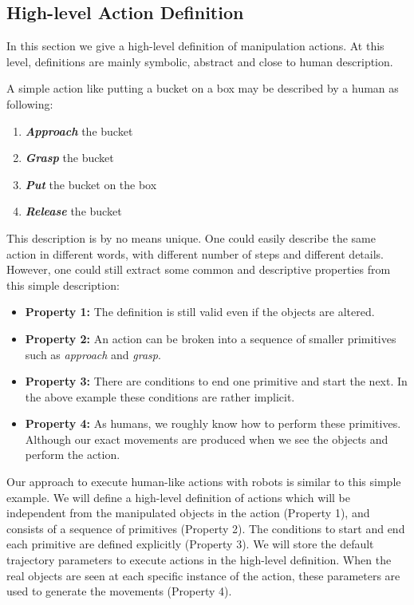  
  


\subsection{High-level Action Definition}
\label{sec:high-level}

In this section we give a high-level definition of manipulation actions.
At this level, definitions are mainly symbolic, abstract and close to human description.

A simple action like putting a bucket on a box may be described by a human as following:
\begin{enumerate}
  \item \textbf{\textit{Approach}} the bucket
  \item \textbf{\textit{Grasp}} the bucket
  \item \textbf{\textit{Put}} the bucket on the box
  \item \textbf{\textit{Release}} the bucket
\end{enumerate}
This description is by no means unique.
One could easily describe the same action in different words, with different number of steps and different details.
However, one could still extract some common and descriptive properties from this simple description:
\begin{itemize}
  \item \textbf{Property 1:} The definition is still valid even if the objects are altered.
  \item \textbf{Property 2:} An action can be broken into a sequence of smaller primitives such as \textit{approach} and \textit{grasp}.
  \item \textbf{Property 3:} There are conditions to end one primitive and start the next. In the above example these conditions are rather implicit.
  \item \textbf{Property 4:} As humans, we roughly know how to perform these primitives.
  Although our exact movements are produced when we see the objects and perform the action.
\end{itemize}


Our approach to execute human-like actions with robots is similar to this simple example.
We will define a high-level definition of actions which will be independent from the manipulated objects in the action (Property 1),
and consists of a sequence of primitives (Property 2).
The conditions to start and end each primitive are defined explicitly (Property 3).
We will store the default trajectory parameters to execute actions in the high-level definition.
When the real objects are seen at each specific instance of the action, these parameters are used to generate the movements (Property 4).


